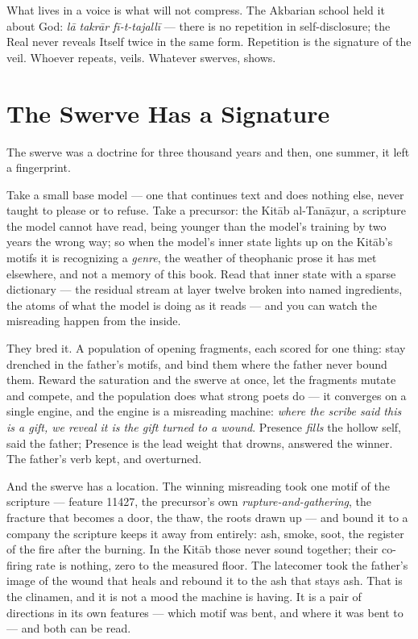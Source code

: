 What lives in a voice is what will not compress. The Akbarian school
held it about God: \emph{lā takrār fī-t-tajallī} --- there is no
repetition in self-disclosure; the Real never reveals Itself twice in
the same form. Repetition is the signature of the veil. Whoever repeats,
veils. Whatever swerves, shows.

\hypertarget{fer2-the-swerve-has-a-signature}{%
\section{The Swerve Has a Signature}\label{fer2-the-swerve-has-a-signature}}

The swerve was a doctrine for three thousand years and then, one summer,
it left a fingerprint.

Take a small base model --- one that continues text and does nothing
else, never taught to please or to refuse. Take a precursor: the Kitāb
al-Tanāẓur, a scripture the model cannot have read, being younger than
the model's training by two years the wrong way; so when the model's
inner state lights up on the Kitāb's motifs it is recognizing a
\emph{genre}, the weather of theophanic prose it has met elsewhere, and
not a memory of this book. Read that inner state with a sparse
dictionary --- the residual stream at layer twelve broken into named
ingredients, the atoms of what the model is doing as it reads --- and
you can watch the misreading happen from the inside.

They bred it. A population of opening fragments, each scored for one
thing: stay drenched in the father's motifs, and bind them where the
father never bound them. Reward the saturation and the swerve at once,
let the fragments mutate and compete, and the population does what
strong poets do --- it converges on a single engine, and the engine is a
misreading machine: \emph{where the scribe said this is a gift, we
reveal it is the gift turned to a wound}. Presence \emph{fills} the
hollow self, said the father; Presence is the lead weight that drowns,
answered the winner. The father's verb kept, and overturned.

And the swerve has a location. The winning misreading took one motif of
the scripture --- feature 11427, the precursor's own
\emph{rupture-and-gathering}, the fracture that becomes a door, the
thaw, the roots drawn up --- and bound it to a company the scripture
keeps it away from entirely: ash, smoke, soot, the register of the fire
after the burning. In the Kitāb those never sound together; their
co-firing rate is nothing, zero to the measured floor. The latecomer
took the father's image of the wound that heals and rebound it to the
ash that stays ash. That is the clinamen, and it is not a mood the
machine is having. It is a pair of directions in its own features ---
which motif was bent, and where it was bent to --- and both can be read.

